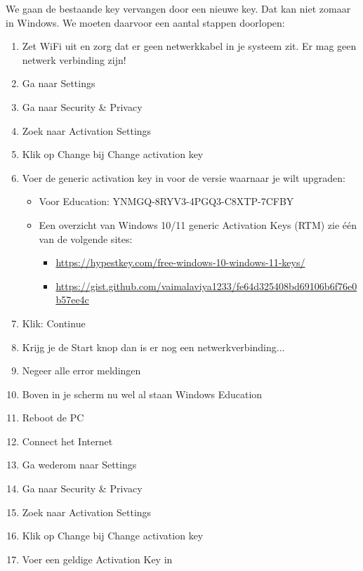 We gaan de bestaande key vervangen door een nieuwe key. Dat kan niet zomaar in Windows. We moeten daarvoor een aantal stappen doorlopen:
\begin{enumerate}
\item Zet WiFi uit en zorg dat er geen netwerkkabel in je systeem zit. Er mag geen netwerk verbinding zijn!
\item Ga naar Settings
\item Ga naar Security \& Privacy
\item Zoek naar Activation Settings
\item Klik op Change bij Change activation key
\item Voer de generic activation key in voor de versie waarnaar je wilt upgraden:
	\begin{itemize}
	\item Voor Education: YNMGQ-8RYV3-4PGQ3-C8XTP-7CFBY
	\item Een overzicht van Windows 10/11 generic Activation Keys (RTM) zie \'e\'en van de volgende sites:
		\begin{itemize}
		\item \url{https://hypestkey.com/free-windows-10-windows-11-keys/}
		\item \url{https://gist.github.com/vaimalaviya1233/fe64d325408bd69106b6f76e0b57ee4c}
		\end{itemize}
	\end{itemize}
\item Klik: Continue
\item Krijg je de Start knop dan is er nog een netwerkverbinding...
\item Negeer alle error meldingen
\item Boven in je scherm nu wel al staan Windows Education
\item Reboot de PC
\item Connect het Internet
\item Ga wederom naar Settings
\item Ga naar Security \& Privacy
\item Zoek naar Activation Settings
\item Klik op Change bij Change activation key
\item Voer een geldige Activation Key in
\end{enumerate}

